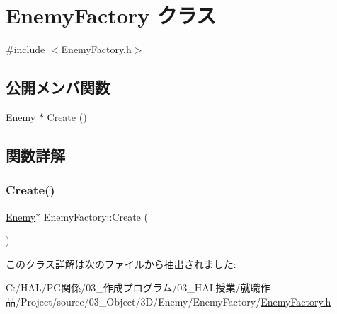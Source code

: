 \hypertarget{class_enemy_factory}{}\section{Enemy\+Factory クラス}
\label{class_enemy_factory}


{\ttfamily \#include $<$Enemy\+Factory.\+h$>$}

\subsection*{公開メンバ関数}
\begin{DoxyCompactItemize}
\item 
\mbox{\hyperlink{class_enemy}{Enemy}} $\ast$ \mbox{\hyperlink{class_enemy_factory_a74729ede6a5f0e1cbdf3215a052e314a}{Create}} ()
\end{DoxyCompactItemize}


\subsection{関数詳解}
\mbox{\label{class_enemy_factory_a74729ede6a5f0e1cbdf3215a052e314a}} 
\subsubsection{\texorpdfstring{Create()}{Create()}}
{\footnotesize\ttfamily \mbox{\hyperlink{class_enemy}{Enemy}}$\ast$ Enemy\+Factory\+::\+Create (\begin{DoxyParamCaption}{ }\end{DoxyParamCaption})\hspace{0.3cm}{\ttfamily [inline]}}



このクラス詳解は次のファイルから抽出されました\+:\begin{DoxyCompactItemize}
\item 
C\+:/\+H\+A\+L/\+P\+G関係/03\+\_\+作成プログラム/03\+\_\+\+H\+A\+L授業/就職作品/\+Project/source/03\+\_\+\+Object/3\+D/\+Enemy/\+Enemy\+Factory/\mbox{\hyperlink{_enemy_factory_8h}{Enemy\+Factory.\+h}}\end{DoxyCompactItemize}
